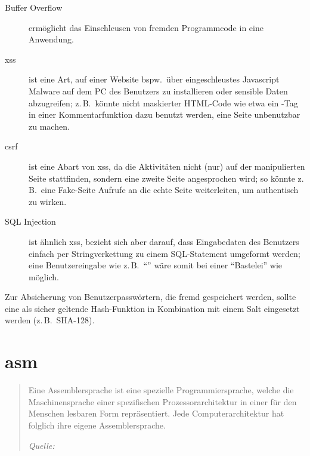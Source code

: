 \begin{description}
    \item[Buffer Overflow] ermöglicht das Einschleusen von fremden Programmcode in eine Anwendung.
    \item[\gls{xss}] ist eine Art, auf einer Website bspw.~über eingeschleustes Javascript Malware auf dem PC des Benutzers zu installieren oder sensible Daten abzugreifen; z.\,B.~könnte nicht maskierter HTML-Code wie etwa ein -Tag in einer Kommentarfunktion dazu benutzt werden, eine Seite unbenutzbar zu machen.
    \item[\gls{csrf}] ist eine Abart von \gls{xss}, da die Aktivitäten nicht (nur) auf der manipulierten Seite stattfinden, sondern eine zweite Seite angesprochen wird; so könnte z.\,B.~eine Fake-Seite Aufrufe an die echte Seite weiterleiten, um authentisch zu wirken.
    \item[SQL Injection] ist ähnlich \gls{xss}, bezieht sich aber darauf, dass Eingabedaten des Benutzers einfach per Stringverkettung zu einem SQL-Statement umgeformt werden; eine Benutzereingabe wie z.\,B.~\enquote{} wäre somit bei einer \enquote{Bastelei} wie  möglich.
\end{description}

Zur Absicherung von Benutzerpasswörtern, die fremd gespeichert werden, sollte eine als sicher geltende Hash-Funktion in Kombination mit einem Salt eingesetzt werden (z.\,B.~SHA-128).


\chapter[Assembler]{\gls{asm}}
\begin{quotation}
  Eine Assemblersprache ist eine spezielle Programmiersprache, welche die Maschinensprache einer spezifischen Prozessorarchitektur in einer für den Menschen lesbaren Form repräsentiert.
  Jede Computerarchitektur hat folglich ihre eigene Assemblersprache.

  \begin{flushright}
    \emph{Quelle: \cite{wiki:Assemblersprache}}
  \end{flushright}
\end{quotation}


